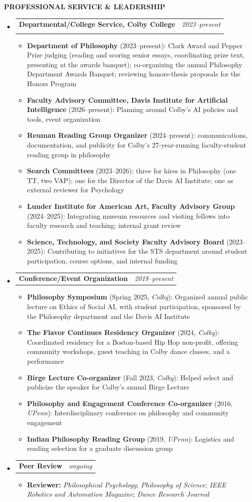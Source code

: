 \documentclass[letterpaper,11pt]{article}
\makeatletter
\newcommand{\resumeSimpleHeading}[2]{
\vspace{0.5mm}\item
    \begin{tabular*}{0.98\textwidth}[t]{l@{\extracolsep{\fill}}r}
        \textbf{#1} & \textit{\footnotesize{#2}} \\
    \end{tabular*}
    \vspace{-2.4mm}
}
\newcommand{\resumeSubheading}[4]{
\vspace{0.5mm}\item
    \begin{tabular*}{0.98\textwidth}[t]{l@{\extracolsep{\fill}}r}
        \textbf{#1, #3} & \textit{\footnotesize{#4}} \\
        \footnotesize{#2}
    \end{tabular*}
    \vspace{-2.4mm}
}
\newcommand{\resumeSubHeadingListStart}{\begin{itemize}[leftmargin=*,labelsep=1mm,itemsep=0.4mm,topsep=0mm]}
\newcommand{\resumeItemListStart}{\begin{itemize}[leftmargin=*,labelsep=1mm,itemsep=0.3mm,topsep=0mm]}
\newcommand{\resumeSubHeadingListEnd}{\end{itemize}}
\newcommand{\resumeItemListEnd}{\end{itemize}}
\newcommand{\cvsection}[1]{%
  \needspace{6\baselineskip}%
  \vspace{1mm}
  \begin{tcolorbox}
    \textbf{\large #1}
  \end{tcolorbox}
  \vspace{1mm}
}
\makeatother
\begin{document}
\cvsection{PROFESSIONAL SERVICE \& LEADERSHIP}
\resumeSubHeadingListStart

\resumeSubheading
    {Departmental/College Service}{}
    {Colby College}{2023--present}
\resumeItemListStart
    \item \textbf{Department of Philosophy} (2023--present): Clark Award and Pepper Prize judging (reading and scoring senior essays, coordinating prize text, presenting at the awards banquet); co-organizing the annual Philosophy Department Awards Banquet; reviewing honors-thesis proposals for the Honors Program
    \item \textbf{Faculty Advisory Committee, Davis Institute for Artificial Intelligence} (2026--present): Planning around Colby's AI policies and tools, event organization
    \item \textbf{Reuman Reading Group Organizer} (2024--present): communications, documentation, and publicity for Colby's 27-year-running faculty-student reading group in philosophy
    \item \textbf{Search Committees} (2023--2026): three for hires in Philosophy (one TT, two VAP); one for the Director of the Davis AI Institute; one as external reviewer for Psychology
    \item \textbf{Lunder Institute for American Art, Faculty Advisory Group} (2024--2025): Integrating museum resources and visiting fellows into faculty research and teaching; internal grant review
    \item \textbf{Science, Technology, and Society Faculty Advisory Board} (2023--2025): Contributing to initiatives for the STS department around student participation, course options, and internal funding
\resumeItemListEnd

\resumeSimpleHeading{Conference/Event Organization}{2018--present}
\resumeItemListStart
    \item \textbf{Philosophy Symposium} (Spring 2025, \textit{Colby}): Organized annual public lecture on Ethics of Social AI, with student participation, sponsored by the Philosophy department and the Davis AI Institute
    \item \textbf{The Flavor Continues Residency Organizer} (2024, \textit{Colby}): Coordinated residency for a Boston-based Hip Hop non-profit, offering community workshops, guest teaching in Colby dance classes, and a performance
    \item \textbf{Birge Lecture Co-organizer} (Fall 2023, \textit{Colby}): Helped select and publicize the speaker for Colby's annual Birge Lecture
    \item \textbf{Philosophy and Engagement Conference Co-organizer} (2016, \textit{UPenn}): Interdisciplinary conference on philosophy and community engagement
    \item \textbf{Indian Philosophy Reading Group} (2019, \textit{UPenn}): Logistics and reading selection for a graduate discussion group
\resumeItemListEnd

\resumeSimpleHeading{Peer Review}{ongoing}
\resumeItemListStart
    \item \textbf{Reviewer:} \textit{Philosophical Psychology}; \textit{Philosophy of Science}; \textit{IEEE Robotics and Automation Magazine}; \textit{Dance Research Journal}
\resumeItemListEnd

\resumeSubHeadingListEnd
\end{document}
